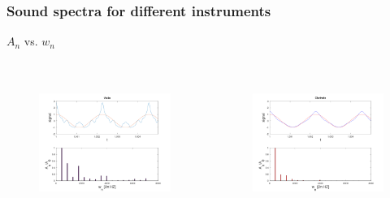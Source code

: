 \documentclass[]{beamer}
\begin{document}


\begin{frame}
\frametitle{Sound spectra for different instruments}
\begin{center}
  $A_n$ vs. $w_n$
\end{center}


\begin{columns}[c]
  \column{2in}  %

  \begin{figure}[h!]
    \begin{center}
      \includegraphics[height=1.8in]{images4/violin.png}
    \end{center}
  \end{figure}
  
  \column{2in}

  \begin{figure}[h!]
    \begin{center}
      \includegraphics[height=1.8in]{images4/Clarinete.png}
    \end{center}
  \end{figure}
  

  \end{columns}


  \end{frame}


\end{document}
